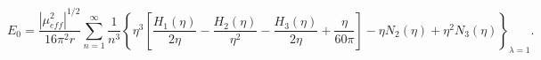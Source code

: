\begin{equation}
E_{0}=\frac{\left|\mu _{eff}^{2}\right|^{1/2}}{16\pi ^{2}r}\sum _{n=1}^{\infty }\frac{1}{n^{3}}\left\{ \eta ^{3}\left[\frac{H_{1}\left(\eta \right)}{2\eta }-\frac{H_{2}\left(\eta \right)}{\eta ^{2}}-\frac{H_{3}\left(\eta \right)}{2\eta }+\frac{\eta }{60\pi }\right]-\eta N_{2}\left(\eta \right)+\eta ^{2}N_{3}\left(\eta \right)\right\} _{\lambda =1}.\end{equation}

